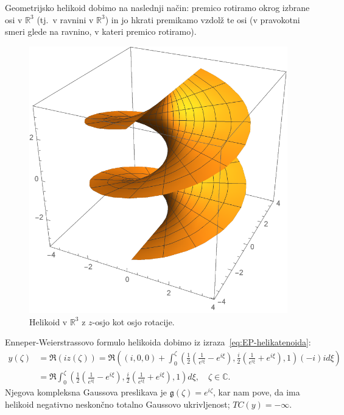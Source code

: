 \documentclass[12pt,a4paper,twoside]{article}
\theoremstyle{definition} %
\theoremstyle{plain} %
\numberwithin{equation}{section}  %
\begin{document}
Geometrijsko helikoid dobimo na naslednji način: premico rotiramo okrog izbrane osi v $\mathbb{R}^3$ (tj.~v ravnini v $\mathbb{R}^3$) in jo hkrati premikamo vzdolž te osi (v pravokotni smeri glede na ravnino, v kateri premico rotiramo).

\begin{figure}[h!]
\begin{center}
\includegraphics[scale=0.8]{images/helicoid.pdf}
\caption{Helikoid v $\mathbb{R}^3$ z $z$-osjo kot osjo rotacije.}
\end{center}
\end{figure}

Enneper-Weierstrassovo formulo helikoida dobimo iz izraza~\eqref{eq:EP-helikatenoida}:
\begin{align}
y(\zeta) &= \Re (iz(\zeta)) = \Re \left( (i,0,0) + \int_{0}^{\zeta} \left( \frac{1}{2} \left(\frac{1}{e^{i\xi}} - e^{i\xi} \right), \frac{i}{2} \left(\frac{1}{e^{i\xi}} + e^{i\xi} \right), 1 \right) (-i) i d\xi \right) \nonumber \\
	&= \Re \int_{0}^{\zeta} \left( \frac{1}{2} \left(\frac{1}{e^{i\xi}} - e^{i\xi} \right), \frac{i}{2} \left(\frac{1}{e^{i\xi}} + e^{i\xi} \right), 1 \right) d\xi, \quad \zeta \in \mathbb{C}.
\end{align}
Njegova kompleksna Gaussova preslikava je $\mathfrak{g}(\zeta) = e^{i\zeta}$, kar nam pove, da ima helikoid negativno neskončno totalno Gaussovo ukrivljenost; $TC(y) = -\infty$. 
\end{document}
